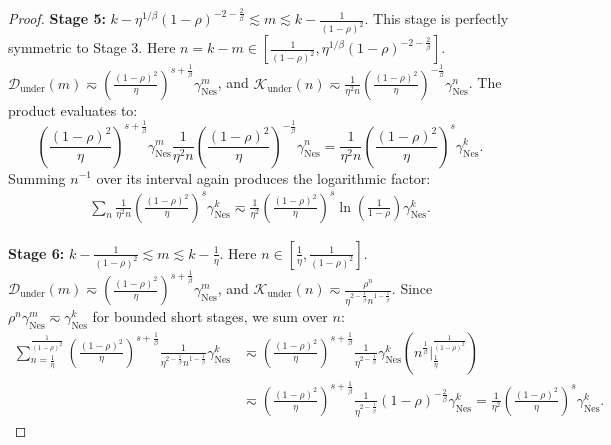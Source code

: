 \begin{proof}
\textbf{Stage 5:} $k - \eta^{1/\beta}(1-\rho)^{-2-\frac{2}{\beta}} \lesssim m \lesssim k - \frac{1}{(1-\rho)^2}$. 
This stage is perfectly symmetric to Stage 3. Here $n = k-m \in \left[\frac{1}{(1-\rho)^2}, \eta^{1/\beta}(1-\rho)^{-2-\frac{2}{\beta}}\right]$. $\mathcal{D}_{\mathrm{under}}(m) \eqsim \left(\frac{(1-\rho)^2}{\eta}\right)^{s+\frac{1}{\beta}} \gamma_{\mathrm{Nes}}^m$, and $\mathcal{K}_{\mathrm{under}}(n) \eqsim \frac{1}{\eta^2 n} \left(\frac{(1-\rho)^2}{\eta}\right)^{-\frac{1}{\beta}} \gamma_{\mathrm{Nes}}^n$. 
The product evaluates to:
\begin{equation*}
    \left(\frac{(1-\rho)^2}{\eta}\right)^{s+\frac{1}{\beta}} \gamma_{\mathrm{Nes}}^m \frac{1}{\eta^2 n} \left(\frac{(1-\rho)^2}{\eta}\right)^{-\frac{1}{\beta}} \gamma_{\mathrm{Nes}}^n = \frac{1}{\eta^2 n} \left(\frac{(1-\rho)^2}{\eta}\right)^s \gamma_{\mathrm{Nes}}^k.
\end{equation*}
Summing $n^{-1}$ over its interval again produces the logarithmic factor:
\begin{align*}
    \sum_{n} \frac{1}{\eta^2 n} \left(\frac{(1-\rho)^2}{\eta}\right)^s \gamma_{\mathrm{Nes}}^k \eqsim \frac{1}{\eta^2} \left(\frac{(1-\rho)^2}{\eta}\right)^s \ln\left(\frac{1}{1-\rho}\right) \gamma_{\mathrm{Nes}}^k.
\end{align*}

\textbf{Stage 6:} $k - \frac{1}{(1-\rho)^2} \lesssim m \lesssim k - \frac{1}{\eta}$. 
Here $n \in \left[\frac{1}{\eta}, \frac{1}{(1-\rho)^2}\right]$. $\mathcal{D}_{\mathrm{under}}(m) \eqsim \left(\frac{(1-\rho)^2}{\eta}\right)^{s+\frac{1}{\beta}} \gamma_{\mathrm{Nes}}^m$, and $\mathcal{K}_{\mathrm{under}}(n) \eqsim \frac{\rho^n}{\eta^{2-\frac{1}{\beta}} n^{1-\frac{1}{\beta}}}$. 
Since $\rho^n \gamma_{\mathrm{Nes}}^m \eqsim \gamma_{\mathrm{Nes}}^k$ for bounded short stages, we sum over $n$:
\begin{align*}
    \sum_{n=\frac{1}{\eta}}^{\frac{1}{(1-\rho)^2}} \left(\frac{(1-\rho)^2}{\eta}\right)^{s+\frac{1}{\beta}} \frac{1}{\eta^{2-\frac{1}{\beta}} n^{1-\frac{1}{\beta}}} \gamma_{\mathrm{Nes}}^k 
    &\eqsim \left(\frac{(1-\rho)^2}{\eta}\right)^{s+\frac{1}{\beta}} \frac{1}{\eta^{2-\frac{1}{\beta}}} \gamma_{\mathrm{Nes}}^k \left( n^{\frac{1}{\beta}} \Big|_{\frac{1}{\eta}}^{\frac{1}{(1-\rho)^2}} \right) \\
    &\eqsim \left(\frac{(1-\rho)^2}{\eta}\right)^{s+\frac{1}{\beta}} \frac{1}{\eta^{2-\frac{1}{\beta}}} (1-\rho)^{-\frac{2}{\beta}} \gamma_{\mathrm{Nes}}^k = \frac{1}{\eta^2} \left(\frac{(1-\rho)^2}{\eta}\right)^s \gamma_{\mathrm{Nes}}^k.
\end{align*}


\end{proof}
